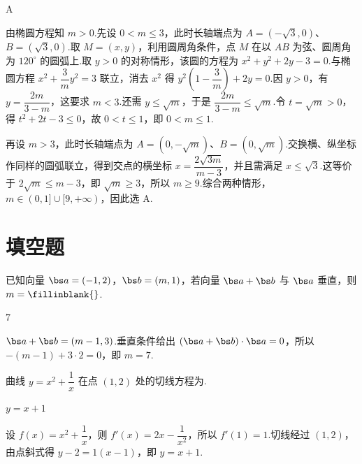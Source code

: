 \begin{answer}
A
\end{answer}

\begin{solution}
由椭圆方程知 \(m>0\).先设 \(0<m\le3\)，此时长轴端点为 \(A=(-\sqrt3,0)\)、\(B=(\sqrt3,0)\).取 \(M=(x,y)\)，利用圆周角条件，点 \(M\) 在以 \(AB\) 为弦、圆周角为 \(120^\circ\) 的圆弧上.取 \(y>0\) 的对称情形，该圆的方程为 \(x^2+y^2+2y-3=0\).与椭圆方程 \(x^2+\dfrac{3}{m}y^2=3\) 联立，消去 \(x^2\) 得 \(y^2\left(1-\dfrac{3}{m}\right)+2y=0\).因 \(y>0\)，有 \(y=\dfrac{2m}{3-m}\)，这要求 \(m<3\).还需 \(y\le\sqrt m\)，于是 \(\dfrac{2m}{3-m}\le\sqrt m\).令 \(t=\sqrt m>0\)，得 \(t^2+2t-3\le0\)，故 \(0<t\le1\)，即 \(0<m\le1\).

再设 \(m>3\)，此时长轴端点为 \(A=(0,-\sqrt m)\)、\(B=(0,\sqrt m)\).交换横、纵坐标作同样的圆弧联立，得到交点的横坐标 \(x=\dfrac{2\sqrt{3m}}{m-3}\)，并且需满足 \(x\le\sqrt3\).这等价于 \(2\sqrt m\le m-3\)，即 \(\sqrt m\ge3\)，所以 \(m\ge9\).综合两种情形，\(m\in(0,1]\cup[9,+\infty)\)，因此选 A.
\end{solution}


\section{填空题}

\begin{problem}
已知向量 \(\bs a=(-1,2)\)，\(\bs b=(m,1)\)，若向量 \(\bs a+\bs b\) 与 \(\bs a\) 垂直，则 \(m=\fillinblank{}\).
\end{problem}

\begin{answer}
\(7\)
\end{answer}

\begin{solution}
\(\bs a+\bs b=(m-1,3)\).垂直条件给出 \((\bs a+\bs b)\cdot\bs a=0\)，所以 \(-(m-1)+3\cdot2=0\)，即 \(m=7\).
\end{solution}

\begin{problem}
曲线 \(y=x^2+\dfrac{1}{x}\) 在点 \((1,2)\) 处的切线方程为\fillinblank{}.
\end{problem}

\begin{answer}
\(y=x+1\)
\end{answer}

\begin{solution}
设 \(f(x)=x^2+\dfrac1x\)，则 \(f'(x)=2x-\dfrac1{x^2}\)，所以 \(f'(1)=1\).切线经过 \((1,2)\)，由点斜式得 \(y-2=1(x-1)\)，即 \(y=x+1\).
\end{solution}

